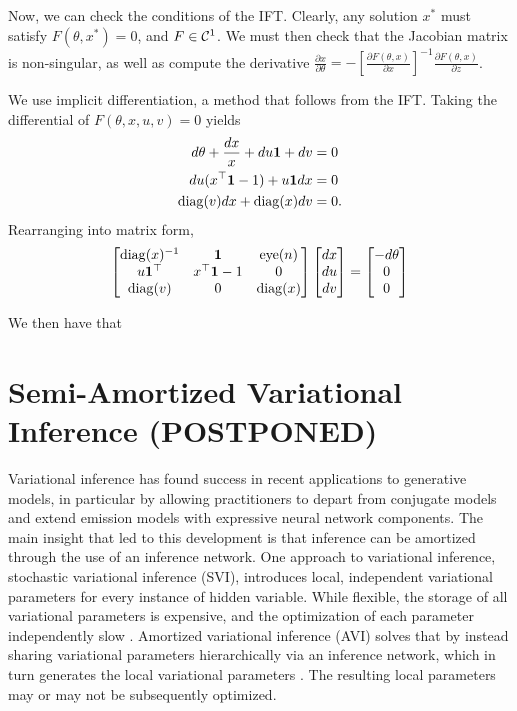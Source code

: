 \documentclass[11pt]{article}
\begin{document}
Now, we can check the conditions of the IFT.
Clearly, any solution $x^*$ must satisfy $F(\theta, x^*) = 0$,
and $F \in \mathcal{C}^1$.
We must then check that the Jacobian matrix is non-singular,
as well as compute the derivative
$\frac{\partial x}{\partial \theta} = -[\frac{\partial F(\theta,x)}{\partial x}]^{-1}
    \frac{\partial F(\theta,x)}{\partial z}$.

We use implicit differentiation, a method that follows from the IFT.
Taking the differential of $F(\theta,x,u,v) = 0$ yields
\begin{equation}
\label{eqn:dsystem}
\begin{aligned}
d\theta + \frac{dx}{x} + du\mathbf{1} + dv &= 0\\
du(x^\top \mathbf{1} - 1) + u\mathbf{1}dx &= 0\\
\mathrm{diag}(v)dx + \mathrm{diag}(x)dv &= 0.
\end{aligned}
\end{equation}
Rearranging into matrix form,
\begin{equation}
\label{eqn:dsystem-matrix}
\begin{bmatrix}
\mathrm{diag}(x)^{-1} & \mathbf{1} & \mathrm{eye}(n) \\
u\mathbf{1}^\top & x^\top\mathbf{1} - 1 & 0\\
\mathrm{diag}(v) & 0 & \mathrm{diag}(x)
\end{bmatrix}
\begin{bmatrix}
dx \\ du \\ dv
\end{bmatrix}
=   
\begin{bmatrix}
-d\theta \\ 0 \\ 0
\end{bmatrix}
\end{equation}

We then have that 

\section{Semi-Amortized Variational Inference (POSTPONED)}
Variational inference has found success in recent applications to generative models,
in particular by allowing practitioners to depart from conjugate models
and extend emission models with expressive neural network components.
The main insight that led to this development is that inference can be amortized through
the use of an inference network.
One approach to variational inference, stochastic variational inference (SVI),
introduces local, independent variational parameters for every instance of hidden variable.
While flexible, the storage of all variational parameters is expensive, and the optimization
of each parameter independently slow \citep{}.
Amortized variational inference (AVI) solves that by instead sharing variational parameters hierarchically
via an inference network, which in turn generates the local variational parameters \citep{}.
The resulting local parameters may or may not be subsequently optimized.
\end{document}
